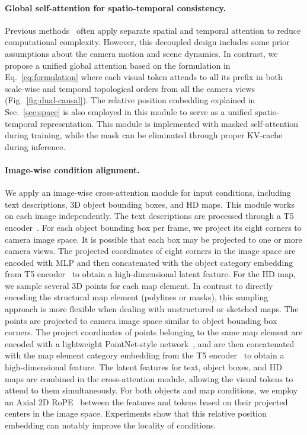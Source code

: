 \paragraph{Global self-attention for spatio-temporal consistency.} Previous methods~\cite{wang2024driving,wen2024panacea,russell2025gaia} often apply separate spatial and temporal attention to reduce computational complexity. However, this decoupled design includes some prior assumptions about the camera motion and scene dynamics. In contrast, we propose a unified global attention based on the formulation in Eq.~\ref{eq:formulation} where each visual token attends to all its prefix in both scale-wise and temporal topological orders from all the camera views (Fig.~\ref{fig:dual-causal}). The relative position embedding explained in Sec.~\ref{sec:space} is also employed in this module to serve as a unified spatio-temporal representation. This module is implemented with masked self-attention during training, while the mask can be eliminated through proper KV-cache during inference. 

\paragraph{Image-wise condition alignment.} We apply an image-wise cross-attention module for input conditions, including text descriptions, 3D object bounding boxes, and HD maps. This module works on each image independently. The text descriptions are processed through a T5 encoder~\cite{raffel2020exploring}. For each object bounding box per frame, we project its eight corners to camera image space. It is possible that each box may be projected to one or more camera views. The projected coordinates of eight corners in the image space are encoded with MLP and then concatenated with the object category embedding from T5 encoder~\cite{raffel2020exploring} to obtain a high-dimensional latent feature. For the HD map, we sample several 3D points for each map element. In contrast to directly encoding the structural map element (\eg polylines or masks), this sampling approach is more flexible when dealing with unstructured or sketched maps. The points are projected to camera image space similar to object bounding box corners. The project coordinates of points belonging to the same map element are encoded with a lightweight PointNet-style network~\cite{qi2017pointnet}, and are then concatenated with the map element category embedding from the T5 encoder~\cite{raffel2020exploring} to obtain a high-dimensional feature. The latent features for text, object boxes, and HD maps are combined in the cross-attention module, allowing the visual tokens to attend to them simultaneously. For both objects and map conditions, we employ an Axial 2D RoPE~\cite{su2024roformer,heo2024rotary} between the features and tokens based on their projected centers in the image space. Experiments show that this relative position embedding can notably improve the locality of conditions.

